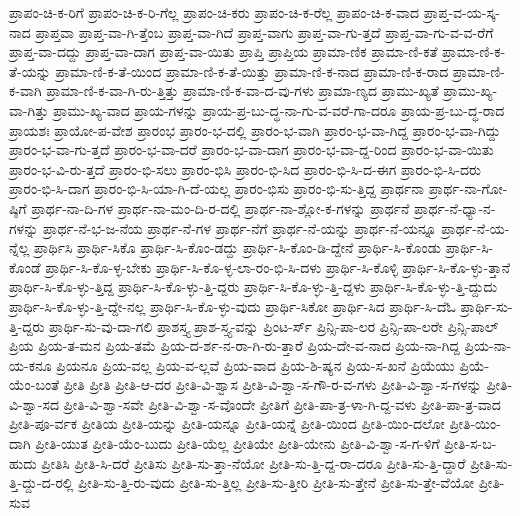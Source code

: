 {ಪ್ರಾಪಂ-ಚಿ-ಕ-ರಿಗೆ
ಪ್ರಾಪಂ-ಚಿ-ಕ-ರಿ-ಗೆಲ್ಲ
ಪ್ರಾಪಂ-ಚಿ-ಕರು
ಪ್ರಾಪಂ-ಚಿ-ಕ-ರೆಲ್ಲ
ಪ್ರಾಪಂ-ಚಿ-ಕ-ವಾದ
ಪ್ರಾಪ್ತ-ವ-ಯ-ಸ್ಕ-ನಾದ
ಪ್ರಾಪ್ತವಾ
ಪ್ರಾಪ್ತ-ವಾ-ಗಿ-ತ್ತೆಂಬ
ಪ್ರಾಪ್ತ-ವಾ-ಗಿದೆ
ಪ್ರಾಪ್ತ-ವಾಗು
ಪ್ರಾಪ್ತ-ವಾ-ಗು-ತ್ತದೆ
ಪ್ರಾಪ್ತ-ವಾ-ಗು-ವ-ವ-ರೆಗೆ
ಪ್ರಾಪ್ತ-ವಾ-ದದ್ದು
ಪ್ರಾಪ್ತ-ವಾ-ದಾಗ
ಪ್ರಾಪ್ತ-ವಾ-ಯಿತು
ಪ್ರಾಪ್ತಿ
ಪ್ರಾಪ್ತಿಯ
ಪ್ರಾಮಾ-ಣಿಕ
ಪ್ರಾಮಾ-ಣಿ-ಕತೆ
ಪ್ರಾಮಾ-ಣಿ-ಕ-ತೆ-ಯನ್ನು
ಪ್ರಾಮಾ-ಣಿ-ಕ-ತೆ-ಯಿಂದ
ಪ್ರಾಮಾ-ಣಿ-ಕ-ತೆ-ಯಿತ್ತು
ಪ್ರಾಮಾ-ಣಿ-ಕ-ನಾದ
ಪ್ರಾಮಾ-ಣಿ-ಕ-ರಾದ
ಪ್ರಾಮಾ-ಣಿ-ಕ-ವಾಗಿ
ಪ್ರಾಮಾ-ಣಿ-ಕ-ವಾ-ಗಿ-ರು-ತ್ತಿತ್ತು
ಪ್ರಾಮಾ-ಣಿ-ಕ-ವಾ-ದ-ವು-ಗಳು
ಪ್ರಾಮಾ-ಣ್ಯದ
ಪ್ರಾಮು-ಖ್ಯತೆ
ಪ್ರಾಮು-ಖ್ಯ-ವಾ-ಗಿತ್ತು
ಪ್ರಾಮು-ಖ್ಯ-ವಾದ
ಪ್ರಾಯ-ಗಳನ್ನು
ಪ್ರಾಯ-ಪ್ರ-ಬು-ದ್ಧ-ನಾ-ಗು-ವ-ವರೆ-ಗಾ-ದರೂ
ಪ್ರಾಯ-ಪ್ರ-ಬು-ದ್ಧ-ರಾದ
ಪ್ರಾಯಶಃ
ಪ್ರಾಯೋ-ಪ-ವೇಶ
ಪ್ರಾರಂಭ
ಪ್ರಾರಂ-ಭ-ದಲ್ಲಿ
ಪ್ರಾರಂ-ಭ-ವಾಗಿ
ಪ್ರಾರಂ-ಭ-ವಾ-ಗಿದ್ದ
ಪ್ರಾರಂ-ಭ-ವಾ-ಗಿದ್ದು
ಪ್ರಾರಂ-ಭ-ವಾ-ಗು-ತ್ತದೆ
ಪ್ರಾರಂ-ಭ-ವಾ-ದರೆ
ಪ್ರಾರಂ-ಭ-ವಾ-ದಾಗ
ಪ್ರಾರಂ-ಭ-ವಾ-ದ್ದ-ರಿಂದ
ಪ್ರಾರಂ-ಭ-ವಾ-ಯಿತು
ಪ್ರಾರಂ-ಭ-ವಿ-ರು-ತ್ತದೆ
ಪ್ರಾರಂ-ಭಿ-ಸಲು
ಪ್ರಾರಂ-ಭಿಸಿ
ಪ್ರಾರಂ-ಭಿ-ಸಿದ
ಪ್ರಾರಂ-ಭಿ-ಸಿ-ದ-ಈಗ
ಪ್ರಾರಂ-ಭಿ-ಸಿ-ದರು
ಪ್ರಾರಂ-ಭಿ-ಸಿ-ದಾಗ
ಪ್ರಾರಂ-ಭಿ-ಸಿ-ಯಾ-ಗಿ-ದೆ-ಯಲ್ಲ
ಪ್ರಾರಂ-ಭಿಸು
ಪ್ರಾರಂ-ಭಿ-ಸು-ತ್ತಿದ್ದ
ಪ್ರಾರ್ಥನಾ
ಪ್ರಾರ್ಥ-ನಾ-ಗೋ-ಷ್ಠಿಗೆ
ಪ್ರಾರ್ಥ-ನಾ-ದಿ-ಗಳ
ಪ್ರಾರ್ಥ-ನಾ-ಮಂ-ದಿ-ರ-ದಲ್ಲಿ
ಪ್ರಾರ್ಥ-ನಾ-ಶ್ಲೋ-ಕ-ಗಳನ್ನು
ಪ್ರಾರ್ಥನೆ
ಪ್ರಾರ್ಥ-ನೆ-ಧ್ಯಾ-ನ-ಗಳನ್ನು
ಪ್ರಾರ್ಥ-ನೆ-ಭ-ಜ-ನೆಯ
ಪ್ರಾರ್ಥ-ನೆ-ಗಳ
ಪ್ರಾರ್ಥ-ನೆಗೆ
ಪ್ರಾರ್ಥ-ನೆ-ಯನ್ನು
ಪ್ರಾರ್ಥ-ನೆ-ಯನ್ನೂ
ಪ್ರಾರ್ಥ-ನೆ-ಯ-ನ್ನೆಲ್ಲ
ಪ್ರಾರ್ಥಿಸಿ
ಪ್ರಾರ್ಥಿ-ಸಿಕೊ
ಪ್ರಾರ್ಥಿ-ಸಿ-ಕೊಂ-ಡದ್ದು
ಪ್ರಾರ್ಥಿ-ಸಿ-ಕೊಂ-ಡಿ-ದ್ದೇನೆ
ಪ್ರಾರ್ಥಿ-ಸಿ-ಕೊಂಡು
ಪ್ರಾರ್ಥಿ-ಸಿ-ಕೊಂಡೆ
ಪ್ರಾರ್ಥಿ-ಸಿ-ಕೊ-ಳ್ಳ-ಬೇಕು
ಪ್ರಾರ್ಥಿ-ಸಿ-ಕೊ-ಳ್ಳ-ಲಾ-ರಂ-ಭಿ-ಸಿ-ದಳು
ಪ್ರಾರ್ಥಿ-ಸಿ-ಕೊಳ್ಳಿ
ಪ್ರಾರ್ಥಿ-ಸಿ-ಕೊ-ಳ್ಳು-ತ್ತಾನೆ
ಪ್ರಾರ್ಥಿ-ಸಿ-ಕೊ-ಳ್ಳು-ತ್ತಿದ್ದ
ಪ್ರಾರ್ಥಿ-ಸಿ-ಕೊ-ಳ್ಳು-ತ್ತಿ-ದ್ದರು
ಪ್ರಾರ್ಥಿ-ಸಿ-ಕೊ-ಳ್ಳು-ತ್ತಿ-ದ್ದಳು
ಪ್ರಾರ್ಥಿ-ಸಿ-ಕೊ-ಳ್ಳು-ತ್ತಿ-ದ್ದುದು
ಪ್ರಾರ್ಥಿ-ಸಿ-ಕೊ-ಳ್ಳು-ತ್ತಿ-ದ್ದೇ-ನಲ್ಲ
ಪ್ರಾರ್ಥಿ-ಸಿ-ಕೊ-ಳ್ಳು-ವುದು
ಪ್ರಾರ್ಥಿ-ಸಿಕೋ
ಪ್ರಾರ್ಥಿ-ಸಿದ
ಪ್ರಾರ್ಥಿ-ಸಿ-ದೆಓ
ಪ್ರಾರ್ಥಿ-ಸು-ತ್ತಿ-ದ್ದರು
ಪ್ರಾರ್ಥಿ-ಸು-ವು-ದಾ-ಗಲಿ
ಪ್ರಾಶಸ್ತ್ಯ
ಪ್ರಾಶ-ಸ್ತ್ಯ-ವನ್ನು
ಪ್ರಿಂಟ-ರ್ಸ್
ಪ್ರಿನ್ಸಿ-ಪಾ-ಲರ
ಪ್ರಿನ್ಸಿ-ಪಾ-ಲರೇ
ಪ್ರಿನ್ಸಿ-ಪಾಲ್
ಪ್ರಿಯ
ಪ್ರಿಯ-ತ-ಮನ
ಪ್ರಿಯ-ತಮೆ
ಪ್ರಿಯ-ದ-ರ್ಶ-ನ-ರಾ-ಗಿ-ರು-ತ್ತಾರೆ
ಪ್ರಿಯ-ದೇ-ವ-ನಾದ
ಪ್ರಿಯ-ನಾ-ಗಿದ್ದ
ಪ್ರಿಯ-ನಾ-ಯ-ಕನೂ
ಪ್ರಿಯನೂ
ಪ್ರಿಯ-ವಲ್ಲ
ಪ್ರಿಯ-ವ-ಲ್ಲವೆ
ಪ್ರಿಯ-ವಾದ
ಪ್ರಿಯ-ಶಿ-ಷ್ಯನ
ಪ್ರಿಯ-ಸ-ಖನೆ
ಪ್ರಿಯೆಯು
ಪ್ರಿಯೆ-ಯೆಂ-ಬಂತೆ
ಪ್ರೀತಿ
ಪ್ರೀತಿ
ಪ್ರೀತಿ-ಆ-ದರ
ಪ್ರೀತಿ-ವಿ-ಶ್ವಾಸ
ಪ್ರೀತಿ-ವಿ-ಶ್ವಾ-ಸ-ಗೌ-ರ-ವ-ಗಳು
ಪ್ರೀತಿ-ವಿ-ಶ್ವಾ-ಸ-ಗಳನ್ನು
ಪ್ರೀತಿ-ವಿ-ಶ್ವಾ-ಸದ
ಪ್ರೀತಿ-ವಿ-ಶ್ವಾ-ಸವೇ
ಪ್ರೀತಿ-ವಿ-ಶ್ವಾ-ಸ-ವೊಂದೇ
ಪ್ರೀತಿಗೆ
ಪ್ರೀತಿ-ಪಾ-ತ್ರ-ಳಾ-ಗಿ-ದ್ದ-ವಳು
ಪ್ರೀತಿ-ಪಾ-ತ್ರ-ವಾದ
ಪ್ರೀತಿ-ಪೂ-ರ್ವಕ
ಪ್ರೀತಿಯ
ಪ್ರೀತಿ-ಯನ್ನು
ಪ್ರೀತಿ-ಯನ್ನೂ
ಪ್ರೀತಿ-ಯನ್ನೆ
ಪ್ರೀತಿ-ಯಿಂದ
ಪ್ರೀತಿ-ಯಿಂ-ದಲೋ
ಪ್ರೀತಿ-ಯಿಂ-ದಾಗಿ
ಪ್ರೀತಿ-ಯುತ
ಪ್ರೀತಿ-ಯೆಂ-ಬುದು
ಪ್ರೀತಿ-ಯೆಲ್ಲ
ಪ್ರೀತಿಯೇ
ಪ್ರೀತಿ-ಯೇನು
ಪ್ರೀತಿ-ವಿ-ಶ್ವಾ-ಸ-ಗ-ಳಿಗೆ
ಪ್ರೀತಿ-ಸ-ಬ-ಹುದು
ಪ್ರೀತಿಸಿ
ಪ್ರೀತಿ-ಸಿ-ದರೆ
ಪ್ರೀತಿಸು
ಪ್ರೀತಿ-ಸು-ತ್ತಾ-ನೆಯೋ
ಪ್ರೀತಿ-ಸು-ತ್ತಿ-ದ್ದ-ರಾ-ದರೂ
ಪ್ರೀತಿ-ಸು-ತ್ತಿ-ದ್ದಾರೆ
ಪ್ರೀತಿ-ಸು-ತ್ತಿ-ದ್ದು-ದ-ರಲ್ಲಿ
ಪ್ರೀತಿ-ಸು-ತ್ತಿ-ರು-ವುದು
ಪ್ರೀತಿ-ಸು-ತ್ತಿಲ್ಲ
ಪ್ರೀತಿ-ಸು-ತ್ತೀರಿ
ಪ್ರೀತಿ-ಸು-ತ್ತೇನೆ
ಪ್ರೀತಿ-ಸು-ತ್ತೇ-ವೆಯೋ
ಪ್ರೀತಿ-ಸುವ
}
